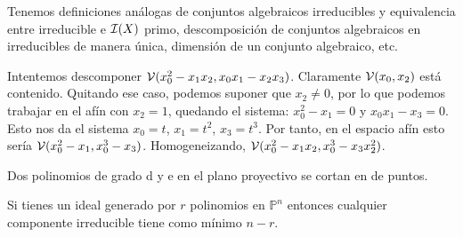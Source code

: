 \documentclass[ACGA.tex]{subfiles}
\begin{document}
Tenemos definiciones análogas de conjuntos algebraicos irreducibles y equivalencia entre irreducible e $\mathcal{I}(X)$ primo, descomposición de conjuntos algebraicos en irreducibles de manera única, dimensión de un conjunto algebraico, etc.

\begin{ejer}
Intentemos descomponer $\mathcal{V}(x_0^2-x_1x_2,x_0x_1-x_2x_3)$. Claramente $\mathcal{V}(x_0,x_2)$ está contenido. Quitando ese caso, podemos suponer que $x_2\neq 0$, por lo que podemos trabajar en el afín con $x_2=1$, quedando el sistema: $x_0^2-x_1=0$ y $x_0x_1-x_3=0$. Esto nos da el sistema $x_0 = t$, $x_1=t^2$, $x_3=t^3$. Por tanto, en el espacio afín esto sería $\mathcal{V}(x_0^2-x_1,x_0^3-x_3)$. Homogeneizando, $\mathcal{V}(x_0^2-x_1x_2,x_0^3-x_3x_2^2)$. 

Dos polinomios de grado d y e en el plano proyectivo se cortan en de puntos.

Si tienes un ideal generado por $r$ polinomios en $\mathbb{P}^n$ entonces cualquier componente irreducible tiene como mínimo $n-r$. 
\end{ejer}
\end{document}
